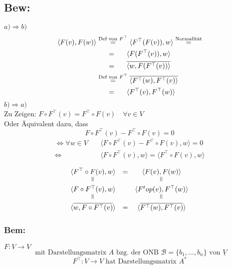 \documentclass[titlepage,12pt,a4paper,ngerman]{report}
\newcommand{\tx}[1]{\textrm{#1}}
\newcommand{\basis}[3]{\{#1_{#2}, \dots, #1_{#3}\}}
\begin{document}
\subsection{Bew:}
$ \boxed{a) \Rightarrow b)} $\\
\begin{align*}
\langle F(v) , F(w) \rangle &\buildrel \tx{Def von }F^\top \over = \langle F^\top(F(v)) , w \rangle \buildrel \tx{Normalität} \over =\\
&\quad \ \, = \quad \ \, \langle F(F^\top(v)) , w \rangle \\
&\quad \ \, = \quad \ \, \overline{\langle w , F(F^\top(v)) \rangle}\\
&\buildrel \tx{Def von } F^\top \over = \overline{\langle F^\top(w) , F^\top(v) \rangle } \\
&\quad \ \, = \quad \ \, \langle F^\top(v) , F^\top (w)\rangle
\end{align*}
$ \boxed{b) \Rightarrow a)} $\\
Zu Zeigen: $ F \circ F^\top(v) = F^\top \circ F(v)  \quad \forall v \in V $\\
Oder Äquivalent dazu, dass $$ F \circ F^\top(v) - F^\top \circ F(v) = 0 $$
\begin{align*}
\Leftrightarrow \forall w \in V \quad &\langle F \circ F^\top(v) - F^\top \circ F(v) , w \rangle = 0\\
\Leftrightarrow \qquad\qquad \ \;  &\langle F \circ F^\top (v) , w \rangle = \langle F^\top \circ F(v) , w \rangle
\end{align*}

$$\begin{array}{ccc}
\langle F^\top \circ F(v), w \rangle &=& \langle F(v) , F(w) \rangle \\ \rotatebox{90}{$\,=$}& & \rotatebox{90}{$\,=$}\\ \langle F \circ F^\top (v) , w \rangle & & \langle F^top (v) , F^\top (w) \rangle \\ \rotatebox{90}{$\,=$} & & \rotatebox{90}{$\,=$} \\
\langle \overline{ w, F \circ F^\top (v)}\rangle & = & \langle \overline{F^\top (w), F^\top (v)} \rangle
\end{array}$$

\subsubsection*{Bem:}  $F: V \to V$ 
$$\tx{ mit Darstellungsmatrix $A$ bzg. der ONB } \mathcal B =\basis{b}{1}{n} \tx{ von } \underline{V}$$
$$F^\top : V \to V \tx{ hat Darstellungsmatrix } A^*$$
\end{document}
